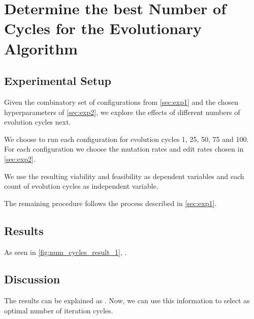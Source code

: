 \documentclass[./../../paper.tex]{subfiles}
\begin{document}
\section{Determine the best Number of Cycles for the Evolutionary Algorithm }

\subsection{Experimental Setup}
\label{sec:exp3}
Given the combinatory set of configurations from \autoref{sec:exp1} and the chosen hyperparameters of \autoref{sec:exp2}, we explore the effects of different numbers of evolution cycles next. 

We choose to run each configuration for evolution cycles 1, 25, 50, 75 and 100. 
For each configuration we choose the mutation rates and edit rates chosen in \autoref{sec:exp2}. 

We use the resulting viability and feasibility as dependent variables and each count of evolution cycles as independent variable.

The remaining procedure follows the process described in \autoref{sec:exp1}.

\subsection{Results}




As seen in \autoref{fig:num_cycles_result_1}, .

\subsection{Discussion}
The results can be explained as . Now, we can use this information to select  as optimal number of iteration cycles. 
\end{document}
